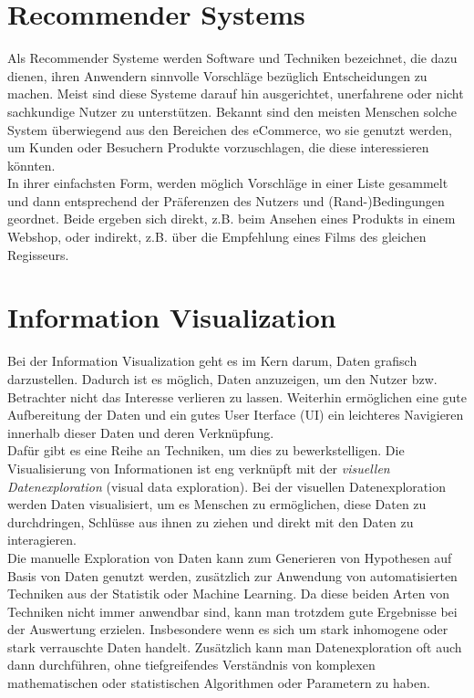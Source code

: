 	\section{Recommender Systems}
	Als Recommender Systeme werden Software und Techniken bezeichnet, die dazu
	dienen, ihren Anwendern sinnvolle Vorschläge bezüglich Entscheidungen zu machen. Meist sind diese Systeme darauf hin ausgerichtet, unerfahrene oder nicht sachkundige Nutzer zu unterstützen. \cite{Fra10}  Bekannt sind den meisten Menschen solche System überwiegend aus den Bereichen des eCommerce, wo sie genutzt werden, um Kunden oder Besuchern Produkte vorzuschlagen, die diese interessieren könnten.\\
	In ihrer einfachsten Form, werden möglich Vorschläge in einer Liste gesammelt und dann entsprechend der Präferenzen des Nutzers und (Rand-)Bedingungen geordnet. Beide ergeben sich direkt, z.B. beim Ansehen eines Produkts in einem Webshop, oder indirekt, z.B. über die Empfehlung eines Films des gleichen Regisseurs. \cite{Fra10} 
	
	\section{Information Visualization}
	Bei der Information Visualization geht es im Kern darum, Daten grafisch
	darzustellen. Dadurch ist es möglich, Daten anzuzeigen, um den
	Nutzer bzw. Betrachter nicht das Interesse verlieren zu lassen. Weiterhin ermöglichen eine gute Aufbereitung der Daten und ein
	gutes User Iterface (UI) ein leichteres Navigieren innerhalb dieser Daten und deren Verknüpfung.\\
	Dafür gibt es eine Reihe an Techniken, um dies zu bewerkstelligen. Die
	Visualisierung von Informationen ist eng verknüpft mit der \textit{visuellen
	Datenexploration} (visual data exploration).
	Bei der visuellen Datenexploration werden Daten visualisiert, um es Menschen zu
	ermöglichen, diese Daten zu durchdringen, Schlüsse aus ihnen zu ziehen und direkt mit den Daten zu interagieren. \cite{Kei02}\\ Die manuelle Exploration von Daten kann zum Generieren von Hypothesen auf Basis von Daten genutzt werden, zusätzlich zur Anwendung von automatisierten Techniken aus der Statistik oder Machine Learning. Da diese beiden Arten von Techniken nicht immer anwendbar sind, kann man trotzdem gute Ergebnisse bei der Auswertung erzielen. Insbesondere wenn es  sich um stark inhomogene oder stark verrauschte Daten handelt. Zusätzlich kann man Datenexploration oft auch dann durchführen, ohne tiefgreifendes Verständnis von komplexen  mathematischen oder statistischen Algorithmen oder Parametern zu haben.\cite{Kei02}
	
